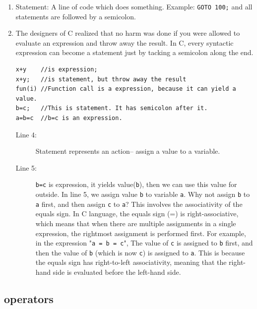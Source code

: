 \documentclass[a4paper,11pt,twoside]{book}
\begin{document}
\begin{itemize}
\begin{enumerate}
		\item Statement: A line of code which does something. Example: \texttt{GOTO 100;} and all statements are followed by a semicolon.
		
		\item The designers of C realized that no harm was done if you were allowed to evaluate an expression and throw away the result. In C, every syntactic expression can become a statement just by tacking a semicolon along the end.
		
\begin{lstlisting}[]
x+y    //is expression;
x+y;   //is statement, but throw away the result
fun(i) //Function call is a expression, because it can yield a value.
b=c;   //This is statement. It has semicolon after it.
a=b=c  //b=c is an expression. 
\end{lstlisting} 		
		
		\begin{description}
			\item[Line 4:]  Statement represents an action-- assign a value to a variable.
			\item[Line 5:] \texttt{b=c} is expression, it yields value(\texttt{b}), then we can use this value for outside. In line 5, we assign value \texttt{b} to variable \texttt{a}. Why not assign \texttt{b} to \texttt{a} first, and then assign \texttt{c} to \texttt{a}? This involves the associativity of the equals sign. In C language, the equals sign (=) is right-associative, which means that when there are multiple assignments in a single expression, the rightmost assignment is performed first. For example, in the expression "\texttt{a = b = c}", The value of \texttt{c} is assigned to \texttt{b} first, and then the value of \texttt{b} (which is now \texttt{c}) is assigned to \texttt{a}. This is because the equals sign has right-to-left associativity, meaning that the right-hand side is evaluated before the left-hand side.
		\end{description}
		
	\end{enumerate}
	
\end{itemize}

\subsection{operators}
\end{document}
